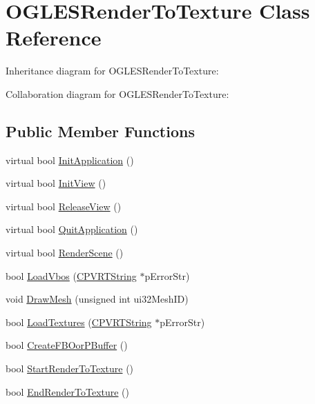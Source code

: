 \hypertarget{class_o_g_l_e_s_render_to_texture}{\section{O\+G\+L\+E\+S\+Render\+To\+Texture Class Reference}
\label{class_o_g_l_e_s_render_to_texture}
}


Inheritance diagram for O\+G\+L\+E\+S\+Render\+To\+Texture\+:


Collaboration diagram for O\+G\+L\+E\+S\+Render\+To\+Texture\+:
\subsection*{Public Member Functions}
\begin{DoxyCompactItemize}
\item 
virtual bool \hyperlink{class_o_g_l_e_s_render_to_texture_adce2487b65df096108c6545da3f8edae}{Init\+Application} ()
\item 
virtual bool \hyperlink{class_o_g_l_e_s_render_to_texture_a14a36ec8e7b158fa68f22167e4a1b747}{Init\+View} ()
\item 
virtual bool \hyperlink{class_o_g_l_e_s_render_to_texture_ab2d2c8b229a25ce2c1a9501d27854bab}{Release\+View} ()
\item 
virtual bool \hyperlink{class_o_g_l_e_s_render_to_texture_a324aec5b05fa505055998637b16bb72d}{Quit\+Application} ()
\item 
virtual bool \hyperlink{class_o_g_l_e_s_render_to_texture_a6d02e90a6be6fe68e763a842f9401d73}{Render\+Scene} ()
\item 
bool \hyperlink{class_o_g_l_e_s_render_to_texture_a7ec7af05e266d820fe4440ca07dd8a02}{Load\+Vbos} (\hyperlink{class_c_p_v_r_t_string}{C\+P\+V\+R\+T\+String} $\ast$p\+Error\+Str)
\item 
void \hyperlink{class_o_g_l_e_s_render_to_texture_ac31cd4a1adafaade1d1fc5f495c3a29e}{Draw\+Mesh} (unsigned int ui32\+Mesh\+I\+D)
\item 
bool \hyperlink{class_o_g_l_e_s_render_to_texture_a296effcfbfd412d1a88ce1cadc088e61}{Load\+Textures} (\hyperlink{class_c_p_v_r_t_string}{C\+P\+V\+R\+T\+String} $\ast$p\+Error\+Str)
\item 
bool \hyperlink{class_o_g_l_e_s_render_to_texture_a803004311d3843649d163b72113ee8b3}{Create\+F\+B\+Oor\+P\+Buffer} ()
\item 
bool \hyperlink{class_o_g_l_e_s_render_to_texture_a17e3691d4c7f7df3375414396f44821d}{Start\+Render\+To\+Texture} ()
\item 
bool \hyperlink{class_o_g_l_e_s_render_to_texture_a3a4147440db4426ad0c00c3b5f2f7173}{End\+Render\+To\+Texture} ()
\end{DoxyCompactItemize}


